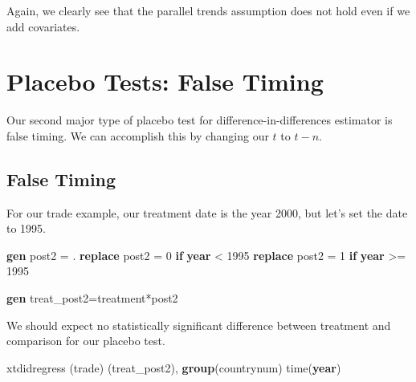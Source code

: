 \documentclass[
]{book}
\newenvironment{Shaded}{\begin{snugshade}}{\end{snugshade}}
\newcommand{\FunctionTok}[1]{\textcolor[rgb]{0.13,0.29,0.53}{\textbf{#1}}}
\newcommand{\KeywordTok}[1]{\textcolor[rgb]{0.13,0.29,0.53}{\textbf{#1}}}
\newcommand{\NormalTok}[1]{#1}
\begin{document}
Again, we clearly see that the parallel trends assumption does not hold even if we add covariates.

\chapter{Placebo Tests: False Timing}\label{placebo-tests-false-timing}

Our second major type of placebo test for difference-in-differences estimator is false timing. We can accomplish this by changing our \(t\) to \(t-n\).

\section{False Timing}\label{false-timing}

For our trade example, our treatment date is the year 2000, but let's set the date to 1995.

\begin{Shaded}
\begin{Highlighting}[]
\KeywordTok{gen}\NormalTok{ post2 = .}
\KeywordTok{replace}\NormalTok{ post2 = 0 }\KeywordTok{if} \FunctionTok{year}\NormalTok{ \textless{} 1995}
\KeywordTok{replace}\NormalTok{ post2 = 1 }\KeywordTok{if} \FunctionTok{year}\NormalTok{ \textgreater{}= 1995}

\KeywordTok{gen}\NormalTok{ treat\_post2=treatment*post2}
\end{Highlighting}
\end{Shaded}

We should expect no statistically significant difference between treatment and comparison for our placebo test.

\begin{Shaded}
\begin{Highlighting}[]
\NormalTok{xtdidregress (trade) (treat\_post2), }\FunctionTok{group}\NormalTok{(countrynum) time(}\FunctionTok{year}\NormalTok{)}
\end{Highlighting}
\end{Shaded}
\end{document}
